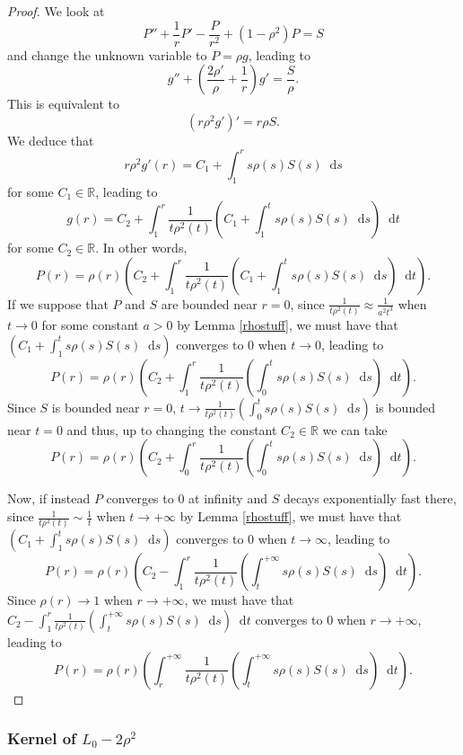 \documentclass[11 pt]{amsart}
\theoremstyle{definition}
\theoremstyle{remark}
\numberwithin{equation}{section}
\newcommand{\dd}{\mathop{}\!\mathrm{d}}
\begin{document}
\begin{proof}
  We look at
  \[ P'' + \frac{1}{r} P' - \frac{P}{r^2} + (1 - \rho^2) P = S \]
and change the unknown variable to $P = \rho g$, leading to
  \[ g'' + \left( \frac{2 \rho'}{\rho} + \frac{1}{r} \right) g' =
     \frac{S}{\rho} . \]
  This is equivalent to
  \[ (r \rho^2 g')' = r \rho S. \]
  We deduce that
  \[ r \rho^2 g' (r) = C_1 + \int_1^r s \rho (s) S (s)\dd s\]
  for some $C_1 \in \mathbb{R}$, leading to
  \[ g (r) = C_2 + \int_1^r \frac{1}{t \rho^2 (t)} \left( C_1 + \int_1^t s
     \rho (s) S (s)\dd s\right)\dd t  \]
  for some $C_2 \in \mathbb{R}$. In other words,
  \[ P (r) = \rho (r) \left( C_2 + \int_1^r \frac{1}{t \rho^2 (t)} \left( C_1
     + \int_1^t s \rho (s) S (s)\dd s\right)\dd t  \right) . \]
  If we suppose that $P$ and $S$ are bounded near $r = 0$, since $\frac{1}{t
  \rho^2 (t)} \approx \frac{1}{a^2 t^3}$ when $t \rightarrow 0$ for some
  constant $a > 0$ by Lemma \ref{rhostuff}, we must have that $\left( C_1 +
  \int_1^t s \rho (s) S (s)\dd s\right)$ converges to $0$ when $t \rightarrow
  0$, leading to
  \[ P (r) = \rho (r) \left( C_2 + \int_1^r \frac{1}{t \rho^2 (t)} \left(
     \int_0^t s \rho (s) S (s)\dd s\right)\dd t  \right) . \]
  Since $S$ is bounded near $r = 0$, $t \rightarrow \frac{1}{t \rho^2 (t)}
  \left( \int_0^t s \rho (s) S (s)\dd s\right)$ is bounded near $t = 0$ and
  thus, up to changing the constant $C_2 \in \mathbb{R}$ we can take
  \[ P (r) = \rho (r) \left( C_2 + \int_0^r \frac{1}{t \rho^2 (t)} \left(
     \int_0^t s \rho (s) S (s)\dd s\right)\dd t  \right) . \]
  
  
  Now, if instead $P$ converges to $0$ at infinity and $S$ decays
  exponentially fast there, since $\frac{1}{t \rho^2 (t)} \sim \frac{1}{t}$
  when $t \rightarrow + \infty$ by Lemma \ref{rhostuff}, we must have that
  $\left( C_1 + \int_1^t s \rho (s) S (s)\dd s\right)$ converges to $0$ when
  $t \rightarrow \infty$, leading to
  \[ P (r) = \rho (r) \left( C_2 - \int_1^r \frac{1}{t \rho^2 (t)} \left(
     \int_t^{+ \infty} s \rho (s) S (s)\dd s\right)\dd t  \right) . \]
  Since $\rho (r) \rightarrow 1$ when $r \rightarrow + \infty$, we must have
  that $C_2 - \int_1^r \frac{1}{t \rho^2 (t)} \left( \int_t^{+ \infty} s \rho
  (s) S (s)\dd s\right)\dd t $ converges to $0$ when $r \rightarrow + \infty$,
  leading to
  \[ P (r) = \rho (r) \left( \int_r^{+ \infty} \frac{1}{t \rho^2 (t)} \left(
     \int_t^{+ \infty} s \rho (s) S (s)\dd s\right)\dd t  \right) . \]
\end{proof}

\subsubsection{Kernel of $L_0 - 2 \rho^2$}
\end{document}
